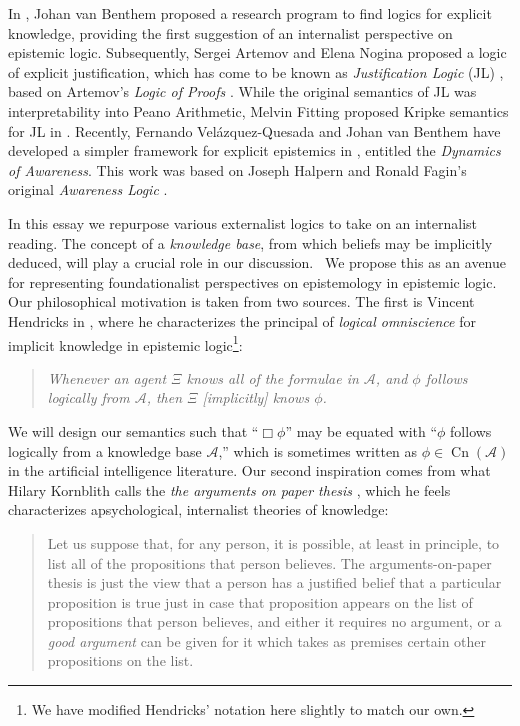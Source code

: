 \documentclass{article}
\newcommand{\tmem}[1]{{\em #1\/}}
\newcommand{\tmop}[1]{\ensuremath{\operatorname{#1}}}
\newcommand{\tmtextit}[1]{{\itshape{#1}}}
\begin{document}
In {\cite{van_benthem_reflectionsepistemic_1991}}, Johan van Benthem proposed
a research program to find logics for explicit knowledge, providing the first
suggestion of an internalist perspective on epistemic logic.  Subsequently,
Sergei Artemov and Elena Nogina proposed a logic of explicit justification,
which has come to be known as \tmtextit{Justification Logic} (JL)
{\cite{artemov_introducing_2005}}, based on Artemov's \tmtextit{Logic of
Proofs} {\cite{artemov_logic_1994}}.  While the original semantics of JL was
interpretability into Peano Arithmetic, Melvin Fitting proposed Kripke
semantics for JL in {\cite{fitting_logic_2005}}.  Recently, Fernando
Vel\'azquez-Quesada and Johan van Benthem have developed a simpler framework
for explicit epistemics in {\cite{van_benthem_inference_2009}}, entitled the
\tmtextit{Dynamics of Awareness}.  This work was based on Joseph Halpern and
Ronald Fagin's original \tmtextit{Awareness Logic} {\cite{fagin_belief_1987}}.



In this essay we repurpose various externalist logics to take on an
internalist reading.  The concept of a \tmtextit{knowledge base}, from which
beliefs may be implicitly deduced, will play a crucial role in our discussion.
\ We propose this as an avenue for representing foundationalist perspectives
on epistemology in epistemic logic.  Our philosophical motivation is taken
from two sources.  The first is Vincent Hendricks in
{\cite{hendricks_mainstream_2006}}, where he characterizes the principal of
{\tmem{logical omniscience}} for implicit knowledge in epistemic
logic{\footnote{We have modified Hendricks' notation here slightly to match
our own.}}:

\begin{quote}
  {\tmem{Whenever an agent $\Xi$ knows all of the formulae in $\mathcal{A}$,
  and $\phi$ follows logically from $\mathcal{A}$, then $\Xi$ [implicitly]
  knows $\phi$.}}
\end{quote}

We will design our semantics such that ``$\Box \phi$'' may be equated with
``$\phi$ follows logically from a knowledge base $\mathcal{A}$,'' which is
sometimes written as $\phi \in \tmop{Cn} ( \mathcal{A})$ in the artificial
intelligence literature.  Our second inspiration comes from what Hilary
Kornblith calls the \tmtextit{the arguments on paper thesis}
{\cite{kornblith_beyond_1980}}, which he feels characterizes apsychological,
internalist theories of knowledge:

\begin{quote}
  Let us suppose that, for any person, it is possible, at least in principle,
  to list all of the propositions that person believes.  The
  arguments-on-paper thesis is just the view that a person has a justified
  belief that a particular proposition is true just in case that proposition
  appears on the list of propositions that person believes, and either it
  requires no argument, or a {\tmem{good argument}} can be given for it which
  takes as premises certain other propositions on the list.
\end{quote}
\end{document}
